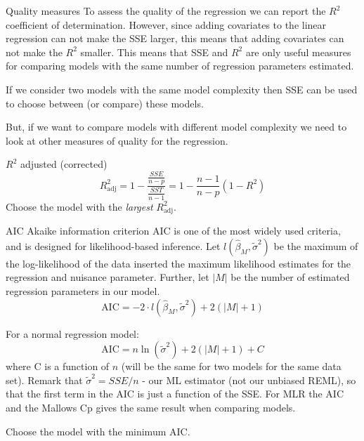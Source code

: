 \documentclass[
  ignorenonframetext,
]{beamer}
\begin{document}
\begin{frame}
\begin{block}{Quality measures}
\label{quality-measures}
To assess the quality of the regression we can report the \(R^2\)
coefficient of determination. However, since adding covariates to the
linear regression can not make the SSE larger, this means that adding
covariates can not make the \(R^2\) smaller. This means that SSE and
\(R^2\) are only useful measures for comparing models with the same
number of regression parameters estimated.

If we consider two models with the same model complexity then SSE can be
used to choose between (or compare) these models.

But, if we want to compare models with different model complexity we
need to look at other measures of quality for the regression.
\end{block}
\end{frame}

\begin{frame}
\begin{block}{\(R^2\) adjusted (corrected)}
\label{r2-adjusted-corrected}
\[R^2_{\text{adj}}=1-\frac{\frac{SSE}{n-p}}{\frac{SST}{n-1}}=1-\frac{n-1}{n-p}(1-R^2)\]
Choose the model with the \emph{largest} \(R^2_{\text{adj}}\).
\end{block}
\end{frame}

\begin{frame}
\begin{block}{AIC Akaike information criterion}
\label{aic-akaike-information-criterion}
AIC is one of the most widely used criteria, and is designed for
likelihood-based inference. Let \(l(\hat{\beta}_M,\tilde{\sigma}^2)\) be
the maximum of the log-likelihood of the data inserted the maximum
likelihood estimates for the regression and nuisance parameter. Further,
let \(\lvert M \rvert\) be the number of estimated regression parameters
in our model.
\[\text{AIC} =-2 \cdot l(\hat{\beta}_M,\tilde{\sigma}^2)+2(\lvert M\rvert +1)\]

For a normal regression model:
\[\text{AIC} =n\ln(\tilde{\sigma}^2)+2(\lvert M\rvert +1)+C\] where C is
a function of \(n\) (will be the same for two models for the same data
set). Remark that \(\tilde{\sigma}^2=SSE/n\) - our ML estimator (not our
unbiased REML), so that the first term in the AIC is just a function of
the SSE. For MLR the AIC and the Mallows Cp gives the same result when
comparing models.

Choose the model with the minimum AIC.
\end{block}
\end{frame}
\end{document}
